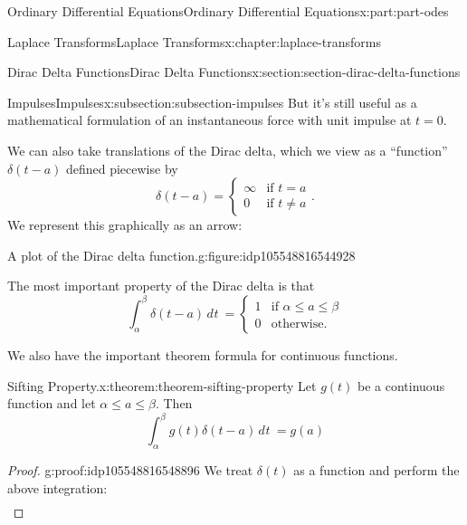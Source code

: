 \documentclass[twoside,10pt,]{book}
\numberwithin{equation}{part}
\providecommand{\dd}[2][]{\, d^{#1} #2\ }
\newcommand{\Int}[2]{\int_{#1}^{#2}}
\newcommand{\amp}{&}
\begin{document}
\begin{partptx}{Ordinary Differential Equations}{}{Ordinary Differential Equations}{}{}{x:part:part-odes}
\begin{chapterptx}{Laplace Transforms}{}{Laplace Transforms}{}{}{x:chapter:laplace-transforms}
\begin{sectionptx}{Dirac Delta Functions}{}{Dirac Delta Functions}{}{}{x:section:section-dirac-delta-functions}
\begin{subsectionptx}{Impulses}{}{Impulses}{}{}{x:subsection:subsection-impulses}
 But it's still useful as a mathematical formulation of an instantaneous force with unit impulse at \(t=0\).%
\par
We can also take translations of the Dirac delta, which we view as a ``function'' \(\delta(t-a)\) defined piecewise by%
\begin{equation*}
\delta(t-a)=
\begin{cases}
\infty \amp\text{if }t=a\\
0 \amp\text{if }t\neq a
\end{cases}.
\end{equation*}
We represent this graphically as an arrow: \begin{figureptx}{A plot of the Dirac delta function.}{g:figure:idp105548816544928}{}%
\begin{image}{0}{1}{0}%
%
\end{image}%
\tcblower
\end{figureptx}%
%
\par
The most important property of the Dirac delta is that%
\begin{equation*}
\Int{\alpha}{\beta}\delta(t-a)\dd{t} = 
\begin{cases}
1 \amp\text{if }\alpha\leq a\leq\beta \\
0 \amp\text{otherwise.}  
\end{cases}
\end{equation*}
%
\par
We also have the important theorem formula for continuous functions.%
\begin{theorem}{Sifting Property.}{}{x:theorem:theorem-sifting-property}%
Let \(g(t)\) be a continuous function and let \(\alpha\leq a\leq\beta\). Then%
\begin{equation*}
\Int{\alpha}{\beta}g(t)\delta(t-a)\dd{t} = g(a)
\end{equation*}
%
\end{theorem}
\begin{proof}{}{g:proof:idp105548816548896}
We treat \(\delta(t)\) as a function and perform the above integration:%
\begin{align*}
\end{align*}

\end{proof}
\end{subsectionptx}
\end{sectionptx}
\end{chapterptx}
\end{partptx}
\end{document}
